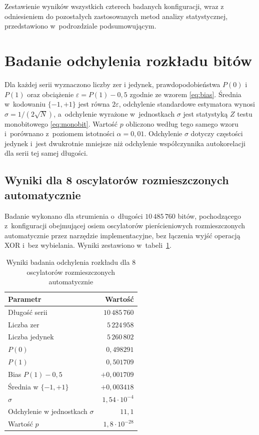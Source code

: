 Zestawienie wyników wszystkich czterech badanych konfiguracji, wraz z odniesieniem do
pozostałych zastosowanych metod analizy statystycznej, przedstawiono w~podrozdziale
podsumowującym.

\FloatBarrier

\section{Badanie odchylenia rozkładu bitów}

Dla każdej serii wyznaczono liczby zer i jedynek, prawdopodobieństwa $P(0)$
i~$P(1)$ oraz obciążenie $\varepsilon = P(1) - 0{,}5$ zgodnie ze wzorem
\eqref{eq:bias}. Średnia w~kodowaniu $\{-1,+1\}$ jest równa $2\varepsilon$,
odchylenie standardowe estymatora wynosi $\sigma = 1/(2\sqrt{N})$, a~odchylenie
wyrażone w~jednostkach $\sigma$ jest statystyką $Z$ testu monobitowego
\eqref{eq:monobit}. Wartość $p$ obliczono według tego samego wzoru i~porównano
z~poziomem istotności $\alpha = 0{,}01$. Odchylenie $\sigma$ dotyczy częstości
jedynek i~jest dwukrotnie mniejsze niż odchylenie współczynnika autokorelacji
dla serii tej samej długości.

\subsection{Wyniki dla 8 oscylatorów rozmieszczonych automatycznie}

Badanie wykonano dla strumienia o~długości $10\,485\,760$ bitów, pochodzącego
z~konfiguracji obejmującej osiem oscylatorów pierścieniowych rozmieszczonych
automatycznie przez narzędzie implementacyjne, bez łączenia wyjść operacją XOR
i~bez wybielania. Wyniki zestawiono w~tabeli~\ref{tab:bias_ro8}.

\begin{table}[H]
    \centering
    \caption{Wyniki badania odchylenia rozkładu dla 8 oscylatorów rozmieszczonych
    automatycznie}
    \label{tab:bias_ro8}
    \small
    \begin{tabular}{lr}
        \toprule
        Parametr & Wartość \\
        \midrule
        Długość serii            & $10\,485\,760$ \\
        Liczba zer               & $5\,224\,958$ \\
        Liczba jedynek           & $5\,260\,802$ \\
        $P(0)$                   & $0{,}498291$ \\
        $P(1)$                   & $0{,}501709$ \\
        Bias $P(1)-0{,}5$        & $+0{,}001709$ \\
        Średnia w $\{-1,+1\}$    & $+0{,}003418$ \\
        $\sigma$                 & $1{,}54 \cdot 10^{-4}$ \\
        Odchylenie w jednostkach $\sigma$ & $11{,}1$ \\
        Wartość $p$              & $1{,}8 \cdot 10^{-28}$ \\
        \bottomrule
    \end{tabular}
\end{table}

